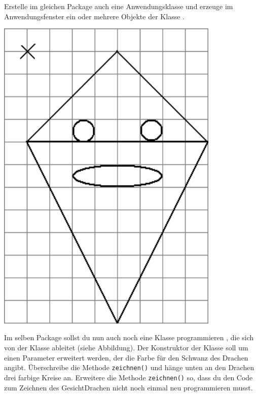 \begin{compactenum}[a)]
\begin{minipage}{0.6\textwidth}
Erstelle im gleichen Package auch eine Anwendungsklasse und erzeuge im
Anwendungsfenster ein oder mehrere Objekte der Klasse .
\end{minipage}
\hfill
\begin{minipage}{0.3\textwidth}
\includegraphics[width=0.8\textwidth]{./inf/SEKII/16_Java_Vererbung/Aufgabe4b.png}
\end{minipage}

\begin{minipage}{0.6\textwidth}
\item Im selben Package sollst du nun auch noch eine Klasse
 programmieren , die sich von der Klasse
 ableitet (siehe Abbildung). Der Konstruktor der Klasse
 soll um einen Parameter erweitert werden, der die Farbe für
den Schwanz des Drachen angibt. Überschreibe die Methode \verb|zeichnen()| und
hänge unten an den Drachen drei farbige Kreise an. Erweitere die Methode
\verb|zeichnen()| so, dass du den Code zum Zeichnen des GesichtDrachen nicht
noch einmal neu programmieren musst.


\end{minipage}
\end{compactenum}
